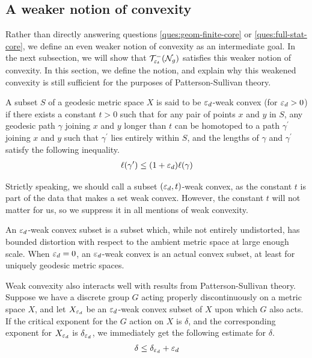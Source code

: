 \documentclass[12pt, reqno]{amsart}
\begin{document}
\subsection{A weaker notion of convexity}
\label{sec:weak-noti-conv}

Rather than directly answering questions \ref{ques:geom-finite-core} or \ref{ques:full-stat-core}, we define an even weaker notion of convexity as an intermediate goal.
In the next subsection, we will show that $\mathcal{T}_{\varepsilon_t}^{-}(\mathcal{N}_g)$ satisfies this weaker notion of convexity.
In this section, we define the notion, and explain why this weakened convexity is still sufficient for the purposes of Patterson-Sullivan theory.

\begin{definition}
  A subset $S$ of a geodesic metric space $X$ is said to be $\varepsilon_d$-weak convex (for $\varepsilon_d > 0$) if there exists a constant $t > 0$ such that for any pair of points $x$ and $y$ in $S$, any geodesic path $\gamma$ joining $x$ and $y$ longer than $t$ can be homotoped to a path $\gamma^{\prime}$ joining $x$ and $y$ such that $\gamma^{\prime}$ lies entirely within $S$, and the lengths of $\gamma$ and $\gamma^{\prime}$ satisfy the following inequality.
  \begin{align*}
    \ell(\gamma^{\prime}) \leq (1 + \varepsilon_d) \ell(\gamma)
  \end{align*}
\end{definition}

\begin{rem}
  Strictly speaking, we should call a subset $(\varepsilon_d, t)$-weak convex, as the constant $t$ is part of the data that makes a set weak convex.
  However, the constant $t$ will not matter for us, so we suppress it in all mentions of weak convexity.
\end{rem}

An $\varepsilon_d$-weak convex subset is a subset which, while not entirely undistorted, has bounded distortion with respect to the ambient metric space at large enough scale.
When $\varepsilon_d = 0$, an $\varepsilon_d$-weak convex is an actual convex subset, at least for uniquely geodesic metric spaces.

Weak convexity also interacts well with results from Patterson-Sullivan theory.
Suppose we have a discrete group $G$ acting properly discontinuously on a metric space $X$, and let $X_{\varepsilon_d}$ be an $\varepsilon_d$-weak convex subset of $X$ upon which $G$ also acts.
If the critical exponent for the $G$ action on $X$ is $\delta$, and the corresponding exponent for $X_{\varepsilon_d}$ is $\delta_{\varepsilon_d}$, we immediately get the following estimate for $\delta$.
\begin{align*}
  \delta \leq \delta_{\varepsilon_d} + \varepsilon_d
\end{align*}
\end{document}
